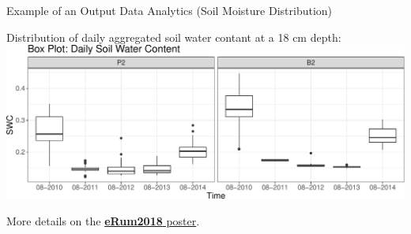 \documentclass[ignorenonframetext,]{beamer}
\begin{document}
\begin{frame}{Example of an Output Data Analytics (Soil Moisture
Distribution)}

Distribution of daily aggregated soil water contant at a 18 cm depth:
\includegraphics{presentation_files/figure-beamer/unnamed-chunk-17-1.pdf}

More details on the
\href{https://github.com/ecor/geotopbricks_doc/blob/master/erum2018_poster/erum2018_poster_cordano_et_al.png}{\textbf{eRum2018}
poster}.

\end{frame}
\end{document}
